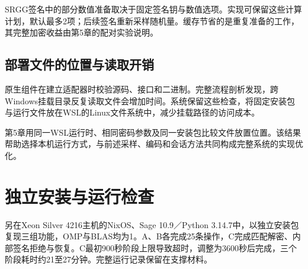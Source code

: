 SRGG签名中的部分数值准备取决于固定签名钥与数值选项。实现可保留这些计算计划，默认最多2项；后续签名重新采样随机量。缓存节省的是重复准备的工作，其完整加密收益由第5章的配对实验说明。

\subsection{部署文件的位置与读取开销}
原生组件在建立适配器时校验源码、接口和二进制。完整流程剖析发现，跨Windows挂载目录反复读取文件会增加时间。系统保留这些检查，将固定安装包与运行文件放在WSL的Linux文件系统中，减少挂载路径的访问成本。

第5章用同一WSL运行时、相同密码参数及同一安装包比较文件放置位置。该结果帮助选择本机运行方式，与前述采样、编码和会话方法共同构成完整系统的实现优化。

\section{独立安装与运行检查}
另在Xeon Silver 4216主机的NixOS、Sage 10.9／Python 3.14.7中，以独立安装包复现三组功能，OMP与BLAS均为1。A、B各完成25条操作，C完成匹配解密、内部签名拒绝与恢复。C最初900秒阶段上限导致超时，调整为3600秒后完成，三个阶段耗时约21至27分钟。完整运行记录保留在支撑材料。
